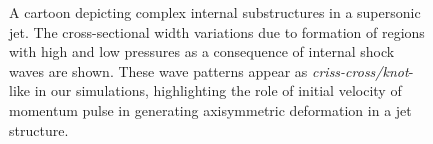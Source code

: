 \documentclass[12pt]{ociamthesis}
\begin{document}
\begin{figure}
\captionsetup[subfigure]{labelformat=empty}
\centering
{}
\caption{A cartoon depicting complex internal substructures in a supersonic jet. The cross-sectional width variations due to formation of regions with high and low pressures as a consequence of internal shock waves are shown. These wave patterns appear as \textit{criss-cross/knot}-like in our simulations, highlighting the role of initial velocity of momentum pulse in generating axisymmetric deformation in a jet structure. }
\label{cartoon_jet_waves}
\end{figure}
\end{document}
